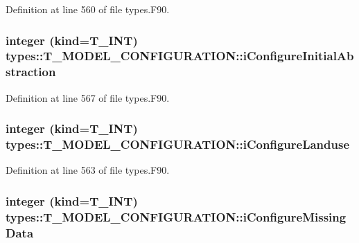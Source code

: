 Definition at line 560 of file types.F90.

\hypertarget{typetypes_1_1_t___m_o_d_e_l___c_o_n_f_i_g_u_r_a_t_i_o_n_afa9b5edda9f4d344a1dfd91b444afec4}{
\subsubsection[{iConfigureInitialAbstraction}]{\setlength{\rightskip}{0pt plus 5cm}integer (kind={\bf T\_\-INT}) {\bf types::T\_\-MODEL\_\-CONFIGURATION::iConfigureInitialAbstraction}}}
\label{typetypes_1_1_t___m_o_d_e_l___c_o_n_f_i_g_u_r_a_t_i_o_n_afa9b5edda9f4d344a1dfd91b444afec4}


Definition at line 567 of file types.F90.

\hypertarget{typetypes_1_1_t___m_o_d_e_l___c_o_n_f_i_g_u_r_a_t_i_o_n_ae871bc1419478bdc46f7aaa05cf8a55a}{
\subsubsection[{iConfigureLanduse}]{\setlength{\rightskip}{0pt plus 5cm}integer (kind={\bf T\_\-INT}) {\bf types::T\_\-MODEL\_\-CONFIGURATION::iConfigureLanduse}}}
\label{typetypes_1_1_t___m_o_d_e_l___c_o_n_f_i_g_u_r_a_t_i_o_n_ae871bc1419478bdc46f7aaa05cf8a55a}


Definition at line 563 of file types.F90.

\hypertarget{typetypes_1_1_t___m_o_d_e_l___c_o_n_f_i_g_u_r_a_t_i_o_n_a1d05af921e3ca39179370f17f3836143}{
\subsubsection[{iConfigureMissingData}]{\setlength{\rightskip}{0pt plus 5cm}integer (kind={\bf T\_\-INT}) {\bf types::T\_\-MODEL\_\-CONFIGURATION::iConfigureMissingData}}}
\label{typetypes_1_1_t___m_o_d_e_l___c_o_n_f_i_g_u_r_a_t_i_o_n_a1d05af921e3ca39179370f17f3836143}


